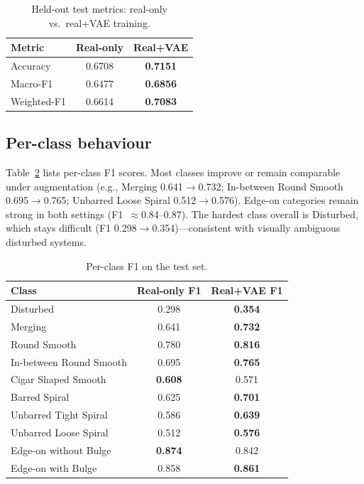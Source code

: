 \documentclass[conference]{IEEEtran}
\begin{document}
\begin{table}[t]
\caption{Held-out test metrics: real-only vs.\ real+VAE training.}
\label{tab:overall}
\centering
\small
\begin{tabular}{lcc}
\toprule
Metric & Real-only & Real+VAE \\
\midrule
Accuracy & 0.6708 & \textbf{0.7151} \\
Macro-F1 & 0.6477 & \textbf{0.6856} \\
Weighted-F1 & 0.6614 & \textbf{0.7083} \\
\bottomrule
\end{tabular}
\end{table}

\subsection{Per-class behaviour}
Table~\ref{tab:perclass} lists per-class F1 scores. Most classes improve or remain comparable under augmentation (e.g., Merging 0.641$\rightarrow$0.732; In-between Round Smooth 0.695$\rightarrow$0.765; Unbarred Loose Spiral 0.512$\rightarrow$0.576). Edge-on categories remain strong in both settings (F1~$\approx$0.84--0.87). The hardest class overall is Disturbed, which stays difficult (F1 0.298$\rightarrow$0.354)---consistent with visually ambiguous disturbed systems.

\begin{table}[t]
\caption{Per-class F1 on the test set.}
\label{tab:perclass}
\centering
\small
\begin{tabular}{lcc}
\toprule
Class & Real-only F1 & Real+VAE F1 \\
\midrule
Disturbed & 0.298 & \textbf{0.354} \\
Merging & 0.641 & \textbf{0.732} \\
Round Smooth & 0.780 & \textbf{0.816} \\
In-between Round Smooth & 0.695 & \textbf{0.765} \\
Cigar Shaped Smooth & \textbf{0.608} & 0.571 \\
Barred Spiral & 0.625 & \textbf{0.701} \\
Unbarred Tight Spiral & 0.586 & \textbf{0.639} \\
Unbarred Loose Spiral & 0.512 & \textbf{0.576} \\
Edge-on without Bulge & \textbf{0.874} & 0.842 \\
Edge-on with Bulge & 0.858 & \textbf{0.861} \\
\bottomrule
\end{tabular}
\end{table}
\end{document}
